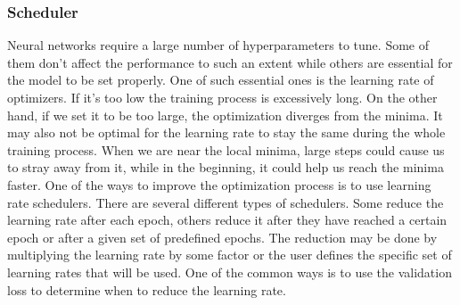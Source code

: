\subsubsection{Scheduler}

Neural networks require a large number of hyperparameters to tune. Some of them don't affect the performance to such an extent while others are essential for the model to be set properly. One of such essential ones is the learning rate of optimizers. If it's too low the training process is excessively long. On the other hand, if we set it to be too large, the optimization diverges from the minima. It may also not be optimal for the learning rate to stay the same during the whole training process. When we are near the local minima, large steps could cause us to stray away from it, while in the beginning, it could help us reach the minima faster.
One of the ways to improve the optimization process is to use learning rate schedulers. There are several different types of schedulers. Some reduce the learning rate after each epoch, others reduce it after they have reached a certain epoch or after a given set of predefined epochs. The reduction may be done by multiplying the learning rate by some factor or the user defines the specific set of learning rates that will be used. One of the common ways is to use the validation loss to determine when to reduce the learning rate.
